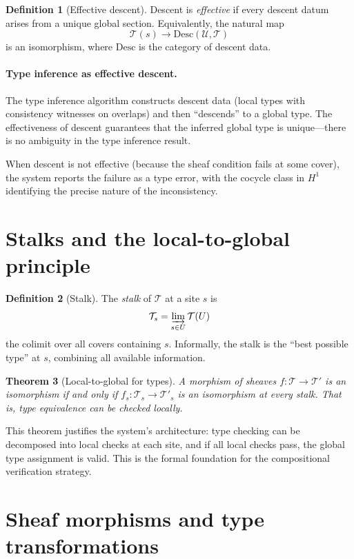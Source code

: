\documentclass[11pt]{report}
\theoremstyle{definition}
\newtheorem{definition}{Definition}[section]
\theoremstyle{plain}
\newtheorem{theorem}[definition]{Theorem}
\begin{document}
\begin{definition}[Effective descent]
Descent is \emph{effective} if every descent datum arises from a unique
global section. Equivalently, the natural map
\[
  \mathcal{T}(s) \to \mathrm{Desc}(\mathcal{U}, \mathcal{T})
\]
is an isomorphism, where $\mathrm{Desc}$ is the category of descent data.
\end{definition}

\paragraph{Type inference as effective descent.}
The type inference algorithm constructs descent data (local types with
consistency witnesses on overlaps) and then ``descends'' to a global type.
The effectiveness of descent guarantees that the inferred global type is
unique---there is no ambiguity in the type inference result.

When descent is not effective (because the sheaf condition fails at some
cover), the system reports the failure as a type error, with the cocycle
class in $H^1$ identifying the precise nature of the inconsistency.

\section{Stalks and the local-to-global principle}

\begin{definition}[Stalk]
The \emph{stalk} of $\mathcal{T}$ at a site $s$ is
\[
  \mathcal{T}_s = \varinjlim_{s \in U} \mathcal{T}(U)
\]
the colimit over all covers containing $s$. Informally, the stalk is the
``best possible type'' at $s$, combining all available information.
\end{definition}

\begin{theorem}[Local-to-global for types]
A morphism of sheaves $f : \mathcal{T} \to \mathcal{T}'$ is an isomorphism
if and only if $f_s : \mathcal{T}_s \to \mathcal{T}'_s$ is an isomorphism
at every stalk. That is, type equivalence can be checked locally.
\end{theorem}

This theorem justifies the system's architecture: type checking can be
decomposed into local checks at each site, and if all local checks pass,
the global type assignment is valid. This is the formal foundation for the
compositional verification strategy.

\section{Sheaf morphisms and type transformations}
\end{document}
